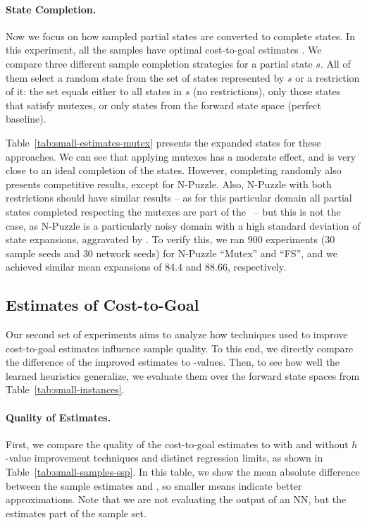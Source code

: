 \paragraph{State Completion.}

Now we focus on how sampled partial states are converted to complete states. In this experiment, all the samples have optimal cost-to-goal estimates \hstar. We compare three different sample completion strategies for a partial state $s$. All of them select a random state from the set of states represented by $s$ or a restriction of it: the set equals either to all states in $s$ (no restrictions), only those states that satisfy mutexes, or only states from the forward state space (perfect baseline).

Table~\ref{tab:small-estimates-mutex} presents the expanded states for these approaches. We can see that applying mutexes has a moderate effect, and is very close to an ideal completion of the states. However, completing randomly also presents competitive results, except for N-Puzzle. Also, N-Puzzle with both restrictions should have similar results -- as for this particular domain all partial states completed respecting the mutexes are part of the \fssp~-- but this is not the case, as N-Puzzle is a particularly noisy domain with a high standard deviation of state expansions, aggravated by \gbfs. To verify this, we ran $900$ experiments ($30$ sample seeds and $30$ network seeds) for N-Puzzle ``Mutex'' and ``FS'', and we achieved similar mean expansions of $84.4$ and $88.66$, respectively.



\subsection{Estimates of Cost-to-Goal}
Our second set of experiments aims to analyze how techniques used to improve cost-to-goal estimates influence sample quality. To this end, we directly compare the difference of the improved estimates to \hstar-values. Then, to see how well the learned heuristics generalize, we evaluate them over the forward state spaces from Table~\ref{tab:small-instances}.

\paragraph{Quality of Estimates.}

First, we compare the quality of the cost-to-goal estimates to \hstar with and without $h$-value improvement techniques and distinct regression limits, as shown in Table~\ref{tab:small-samples-ssp}. In this table, we show the mean absolute difference between the sample estimates and \hstar, so smaller means indicate better approximations. Note that we are not evaluating the output of an NN, but the estimates part of the sample set.

